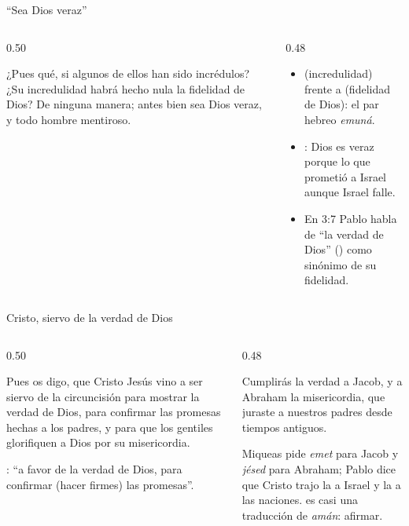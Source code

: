 \begin{frame}{``Sea Dios veraz''}
\begin{columns}[t,onlytextwidth]
\begin{column}{0.50\textwidth}
\begin{cita}¿Pues qué, si algunos de ellos han sido incrédulos? ¿Su incredulidad habrá hecho nula la fidelidad de Dios? De ninguna manera; antes bien sea Dios veraz, y todo hombre mentiroso.\end{cita}
\end{column}
\begin{column}{0.48\textwidth}\small
\begin{itemize}
\item {} (incredulidad) frente a  (fidelidad de Dios): el par hebreo \emph{emuná}.
\item {}: Dios es veraz porque  lo que prometió a Israel aunque Israel falle.
\item En 3:7 Pablo habla de ``la verdad de Dios'' () como sinónimo de su fidelidad.
\end{itemize}
\end{column}
\end{columns}\par\smallskip
{}
\end{frame}

\begin{frame}{Cristo, siervo de la verdad de Dios}
\begin{columns}[t,onlytextwidth]
\begin{column}{0.50\textwidth}
\begin{cita}Pues os digo, que Cristo Jesús vino a ser siervo de la circuncisión para mostrar la verdad de Dios, para confirmar las promesas hechas a los padres, y para que los gentiles glorifiquen a Dios por su misericordia.\end{cita}
\scriptsize{}: ``a favor de la verdad de Dios, para confirmar (hacer firmes) las promesas''.
\end{column}
\begin{column}{0.48\textwidth}
\begin{cita}Cumplirás la verdad a Jacob, y a Abraham la misericordia, que juraste a nuestros padres desde tiempos antiguos.\end{cita}
\small Miqueas pide \emph{emet} para Jacob y \emph{jésed} para Abraham; Pablo dice que Cristo trajo la  a Israel y la  a las naciones.  es casi una traducción de \emph{amán}: afirmar.
\end{column}
\end{columns}
\end{frame}

